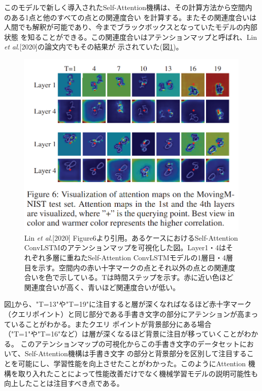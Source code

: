 このモデルで新しく導入されたSelf-Attention機構は、その計算方法から空間内のある1点と他のすべての点との関連度合い
を計算する。またその関連度合いは人間でも解釈が可能であり、今までブラックボックスとなっていたモデルの内部状態
を知ることができる。この関連度合いはアテンションマップと呼ばれ、Lin \textit{et al}.[2020]の論文内でもその結果が
示されていた(図\ref{fig:lin-et-al-attention-map})。

\begin{figure}[H]
\begin{center}
\includegraphics[width=0.9\linewidth]{fig/intro/lin-et-al-attention-map.png}
\captionsetup{width=0.9\linewidth}
\caption{Lin \textit{et al}.[2020] Figure6より引用。あるケースにおけるSelf-Attention ConvLSTMのアテンションマップを可視化した図。Layer1・4はそれぞれ多層に重ねたSelf-Attention ConvLSTMモデルの1層目・4層目を示す。空間内の赤い十字マークの点とそれ以外の点との関連度合いを色で示している。Tは時間ステップを示す。赤に近い色ほど関連度合いが高く、青いほど関連度合いが低い。}
\label{fig:lin-et-al-attention-map}
\end{center}
\end{figure}

図\ref{fig:lin-et-al-attention-map}から、"T=13"や"T=19"に注目すると層が深くなればなるほど赤十字マーク
（クエリポイント）と同じ部分である手書き文字の部分にアテンションが高まっていることがわかる。またクエリ
ポイントが背景部分にある場合（"T=1"や"T=16"など）は層が深くなるほど背景に注目が移っていくことがわかる。
このアテンションマップの可視化からこの手書き文字のデータセットにおいて、Self-Attention機構は手書き文字
の部分と背景部分を区別して注目することを可能にし、学習性能を向上させたことがわかった。このようにAttention
機構を取り入れたことによって性能改善だけでなく機械学習モデルの説明可能性も向上したことは注目すべき点である。